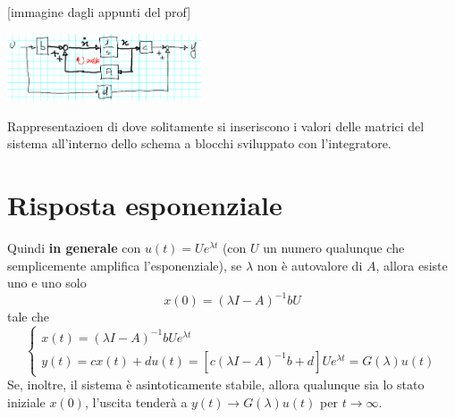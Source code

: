     [immagine dagli appunti del prof]
    \begin{center}
        \includegraphics[height=2cm]{../lezione8/img1.PNG}
    \end{center}
    Rappresentazioen di dove solitamente si inseriscono i valori delle matrici del sistema all'interno dello schema a blocchi sviluppato con l'integratore.
    \newpage\section{Risposta esponenziale}
    Quindi \textbf{in generale} con $u(t) = U e^{\lambda t}$ (con $U$ un numero qualunque che semplicemente amplifica l'esponenziale), se $\lambda$ non è autovalore di $A$, allora esiste uno e uno solo 
    \[
        x(0) = (\lambda I - A)^{-1}b U
    \] tale che 
    \[
        \begin{cases}
            x(t) = (\lambda I -A)^{-1} b U e^{\lambda t}\\
            y(t) = cx(t) + du(t) =  [c(\lambda I -A)^{-1} b + d] U e^{\lambda t} = G(\lambda) u(t)
        \end{cases}
    \]
    Se, inoltre, il sistema è asintoticamente stabile, allora qualunque sia lo stato iniziale $x(0)$, l'uscita tenderà a $y(t) \rightarrow G(\lambda) u(t)$ per $t \rightarrow  \infty$.
